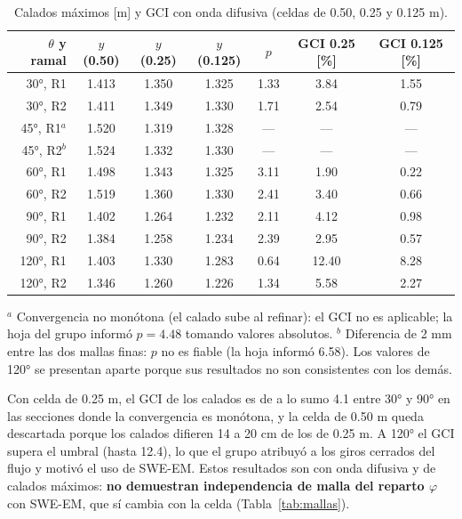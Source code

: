 \begin{table}[H]
\centering\small
\caption{Calados máximos [m] y GCI con onda difusiva (celdas de 0.50, 0.25 y 0.125 m).}\label{tab:gci}
\begin{tabular}{rcccccc}
\toprule
$\theta$ y ramal & $y$ (0.50) & $y$ (0.25) & $y$ (0.125) & $p$ & GCI 0.25 [\%] & GCI 0.125 [\%]\\\midrule
30°, R1 & 1.413 & 1.350 & 1.325 & 1.33 & 3.84 & 1.55\\
30°, R2 & 1.411 & 1.349 & 1.330 & 1.71 & 2.54 & 0.79\\
45°, R1$^{a}$ & 1.520 & 1.319 & 1.328 & --- & --- & ---\\
45°, R2$^{b}$ & 1.524 & 1.332 & 1.330 & --- & --- & ---\\
60°, R1 & 1.498 & 1.343 & 1.325 & 3.11 & 1.90 & 0.22\\
60°, R2 & 1.519 & 1.360 & 1.330 & 2.41 & 3.40 & 0.66\\
90°, R1 & 1.402 & 1.264 & 1.232 & 2.11 & 4.12 & 0.98\\
90°, R2 & 1.384 & 1.258 & 1.234 & 2.39 & 2.95 & 0.57\\\midrule
120°, R1 & 1.403 & 1.330 & 1.283 & 0.64 & 12.40 & 8.28\\
120°, R2 & 1.346 & 1.260 & 1.226 & 1.34 & 5.58 & 2.27\\\bottomrule
\end{tabular}

\smallskip\footnotesize $^{a}$ Convergencia no monótona (el calado sube al refinar): el GCI no es aplicable; la hoja del grupo informó $p=4.48$ tomando valores absolutos. $^{b}$ Diferencia de 2 mm entre las dos mallas finas: $p$ no es fiable (la hoja informó 6.58). Los valores de 120° se presentan aparte porque sus resultados no son consistentes con los demás.
\end{table}

Con celda de 0.25 m, el GCI de los calados es de a lo sumo 4.1\pc{} entre 30° y 90° en las secciones donde la convergencia es monótona, y la celda de 0.50 m queda descartada porque los calados difieren 14 a 20 cm de los de 0.25 m. A 120° el GCI supera el umbral (hasta 12.4\pc), lo que el grupo atribuyó a los giros cerrados del flujo y motivó el uso de SWE-EM. Estos resultados son con onda difusiva y de calados máximos: \textbf{no demuestran independencia de malla del reparto $\varphi$} con SWE-EM, que sí cambia con la celda (Tabla~\ref{tab:mallas}).


